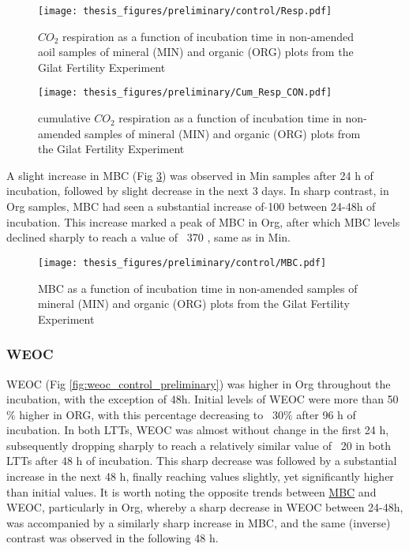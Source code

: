\documentclass[12pt]{report}
\begin{document}
		\begin{figure}[H]
			\centering
			\texttt{[image: thesis\_figures/preliminary/control/Resp.pdf]}
			\caption{$CO_2$ respiration as a function of incubation time in non-amended aoil samples of mineral (MIN) and organic (ORG) plots from the Gilat Fertility Experiment}
			\label{fig:resp_control_preliminary}
		\end{figure}
		
		\begin{figure}[H]
			\centering
			\texttt{[image: thesis\_figures/preliminary/Cum\_Resp\_CON.pdf]}
			\caption{cumulative $CO_2$ respiration  as a function of incubation time in non-amended samples  of mineral (MIN) and organic (ORG) plots from the Gilat Fertility Experiment}
			\label{fig:cum_resp_control_preliminary}
		\end{figure}
		\noindent A slight increase in MBC (Fig \ref{fig:mbc_control_preliminary}) was observed in Min samples after 24 h of incubation, followed by slight decrease in the next 3 days.  In sharp contrast, in Org samples, MBC had seen a substantial increase of $ \tilde{} $100 \genericunit  between 24-48h of incubation. This increase marked a peak of MBC in Org, after which MBC levels declined sharply to reach a value of ~370 \genericunit, same as in Min.
		
		\begin{figure}[H]
			\centering
			\texttt{[image: thesis\_figures/preliminary/control/MBC.pdf]}
			\caption{MBC  as a function of incubation time in non-amended samples  of mineral (MIN) and organic (ORG) plots from the Gilat Fertility Experiment}
			\label{fig:mbc_control_preliminary}
		\end{figure}
		
		\subsubsection{WEOC}
		WEOC  (Fig \ref{fig:weoc_control_preliminary}) was higher in Org throughout the incubation, with the exception of 48h. Initial levels of WEOC were more than 50$\%$ higher in ORG, with this percentage decreasing to ~30$\%$ after 96 h of incubation. In both LTTs, WEOC was almost without change in the first 24 h, subsequently dropping sharply to reach a relatively similar value of ~20 \genericunit in both LTTs after 48 h of incubation. This sharp decrease was followed by a substantial increase in the next 48 h, finally reaching values  slightly, yet significantly higher than initial values. It is worth noting the opposite trends between \hyperref[fig:mbc_control_main]{MBC} and WEOC, particularly in  Org, whereby  a sharp decrease in WEOC between 24-48h, was accompanied by a similarly sharp increase in MBC, and the same (inverse) contrast was observed in the following 48 h.
		
\end{document}
